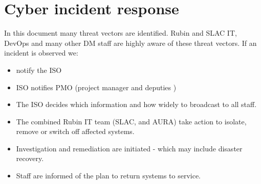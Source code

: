 \section{Cyber incident response}
In this document many threat vectors are identified.
Rubin and SLAC  IT, DevOps and many other \gls{DM} staff are highly aware of these threat vectors.
If an incident is observed we:
\begin{itemize}
\item notify the \gls{ISO} 
\item \gls{ISO} notifies \gls{PMO} (project manager and deputies )
\item The \gls{ISO} decides which information and  how widely to broadcast to all staff.
\item The combined Rubin \gls{IT} team (SLAC, and AURA)  take action to isolate, remove or  switch off affected systems.
\item Investigation and remediation are initiated - which may include disaster recovery.
\item Staff are informed of the plan to return systems to service.
\end{itemize}

